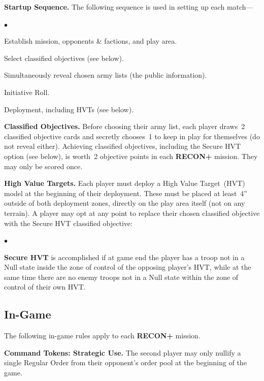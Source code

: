 \documentclass[14pt,dvipsnames]{extarticle}
\newcommand{\missionrule}[1]{\noindent\textbf{#1}\xspace}
\newenvironment{squishitemize}
{\begin{list}{$\bullet$}{%
    \setlength{\itemsep}{2pt}%
    \setlength{\parsep}{2pt}%
    \setlength{\topsep}{2pt}%
    \setlength{\parskip}{0pt} %
    \renewcommand{\labelitemi}{--}}}
  {\end{list}}
\newcommand{\reconplus}{\textbf{RECON+}\xspace}
\begin{document}
\missionrule{Startup Sequence.}  The following sequence is used in
setting up each match---

\begin{squishitemize}  
\item Establish mission, opponents \& factions, and play area.

\item Select classified objectives (see below).
  
\item Simultaneously reveal chosen army lists (the public information).

\item Initiative Roll.

\item Deployment, including HVTs (see below).
\end{squishitemize}

\missionrule{Classified Objectives.}  Before choosing their army list,
each player draws~2 classified objective cards and secretly chooses~1
to keep in play for themselves (do not reveal either).  Achieving
classified objectives, including the Secure HVT option (see below), is
worth~2 objective points in each \reconplus mission.  They may only be
scored once.

\missionrule{High Value Targets.}  Each player must deploy a High
Value Target~(HVT) model at the beginning of their deployment.  These
must be placed at least~4'' outside of both deployment zones, directly
on the play area itself (not on any terrain).  A player may opt at any
point to replace their chosen classified objective with the Secure HVT
classified objective:

\begin{squishitemize}
\item \textbf{Secure HVT} is accomplished if at game end the player
  has a troop not in a Null state inside the zone of control of the
  opposing player's HVT, while at the same time there are no enemy
  troops not in a Null state within the zone of control of their own
  HVT.
\end{squishitemize}

\clearpage
\subsection{In-Game}

The following in-game rules apply to each \reconplus mission.

\missionrule{Command Tokens: Strategic Use.}  The second player may
only nullify a single Regular Order from their opponent's order pool
at the beginning of the game.
\end{document}

